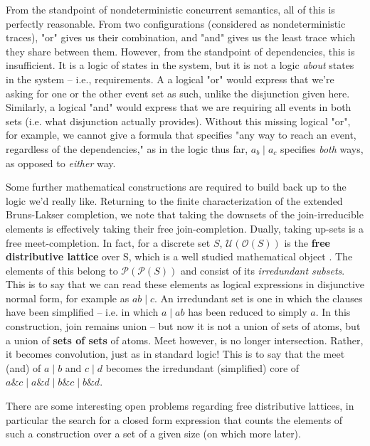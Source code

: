 \documentclass[hoptionsi,review,format=acmsmall]{acmart}
\theoremstyle{definition}
\newcommand{\Oc}{\mathcal{O}}
\newcommand{\Pc}{\mathcal{P}}
\newcommand{\Ucc}{\mathcal{U}}
\newcommand{\band}{\mathbin{\&}}
\newcommand{\bor}{\mathbin{|}}
\begin{document}

From the standpoint of nondeterministic concurrent semantics, all of this is perfectly reasonable. From two configurations (considered as nondeterministic traces), "or" gives us their combination, and "and" gives us the least trace which they share between them. However, from the standpoint of dependencies, this is insufficient. It is a logic of states in the system, but it is not a logic \textit{about} states in the system -- i.e., requirements. A a logical "or"  would express that we're asking for one or the other event set as such, unlike the disjunction given here. Similarly, a logical "and" would express that we are requiring all events in both sets (i.e. what disjunction actually provides). Without this missing logical "or", for example, we cannot give a formula that specifies "any way to reach an event, regardless of the dependencies," as in the logic thus far, \(a_b \bor a_c\) specifies \textit{both} ways, as opposed to \textit{either} way.

Some further mathematical constructions are required to build back up to the logic we'd really like. Returning to the finite characterization of the extended Bruns-Lakser completion, we note that taking the downsets of the join-irreducible elements is effectively taking their free join-completion. Dually, taking up-sets is a free meet-completion. In fact, for a discrete set \(S\), \(\Ucc(\Oc(S))\) is the \textbf{free distributive lattice} over S, which is a well studied mathematical object \cite{gratzer2009lattice}. The elements of this belong to \(\Pc(\Pc(S))\) and consist of its \textit{irredundant subsets}. This is to say that we can read these elements as logical expressions in disjunctive normal form, for example as \(ab \bor c\). An irredundant set is one in which the clauses have been simplified -- i.e. in which \(a \bor ab\) has been reduced to simply \(a\).  In this construction, join remains union -- but now it is not a union of sets of atoms, but a union of \textbf{sets of sets} of atoms. Meet however, is no longer intersection. Rather, it becomes convolution, just as in standard logic! This is to say that the meet (and) of \(a \bor b\) and \(c \bor d\) becomes the irredundant (simplified) core of \(a \band c \bor a \band d \bor b \band c \bor b \band d\).

There are some interesting open problems regarding free distributive lattices, in particular the search for a closed form expression that counts the elements of such a construction over a set of a given size (on which more later).
\end{document}
